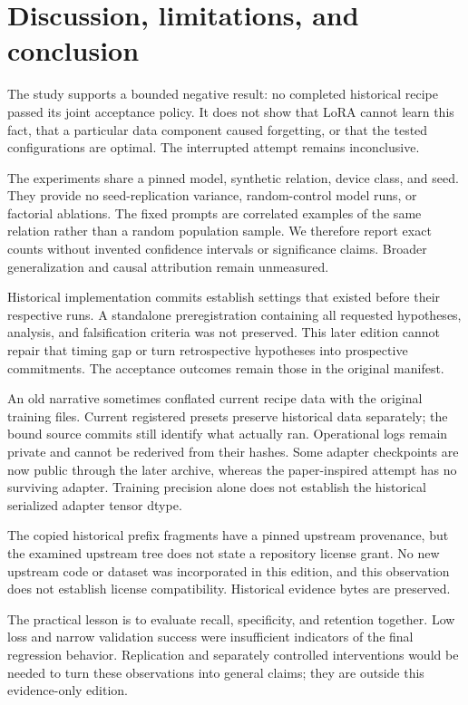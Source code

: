 \section{Discussion, limitations, and conclusion}
The study supports a bounded negative result: no completed historical recipe
passed its joint acceptance policy. It does not show that LoRA cannot learn
this fact, that a particular data component caused forgetting, or that the
tested configurations are optimal. The interrupted attempt remains
inconclusive.\citep{historicalmanifest,retrospective}

The experiments share a pinned model, synthetic relation, device class, and
seed. They provide no seed-replication variance, random-control model runs, or
factorial ablations. The fixed prompts are correlated examples of the same
relation rather than a random population sample. We therefore report exact
counts without invented confidence intervals or significance claims.
Broader generalization and causal attribution remain unmeasured.
\citep{retrospective}

Historical implementation commits establish settings that existed before their
respective runs. A standalone preregistration containing all requested
hypotheses, analysis, and falsification criteria was not preserved. This later
edition cannot repair that timing gap or turn retrospective hypotheses into
prospective commitments. The acceptance outcomes remain those in the original
manifest.\citep{historicalmanifest,retrospective}

An old narrative sometimes conflated current recipe data with the original
training files. Current registered presets preserve historical data separately;
the bound source commits still identify what actually ran. Operational logs
remain private and cannot be rederived from their hashes. Some adapter
checkpoints are now public through the later archive, whereas the
paper-inspired attempt has no surviving adapter. Training precision alone
does not establish the historical serialized adapter tensor dtype.
\citep{historicalmanifest,retrospective,archive,currentregistry}

The copied historical prefix fragments have a pinned upstream provenance, but
the examined upstream tree does not state a repository license grant. No new
upstream code or dataset was incorporated in this edition, and this observation
does not establish license compatibility. Historical evidence bytes are
preserved.\citep{gangadhar2024data,upstreamtree}

The practical lesson is to evaluate recall, specificity, and retention
together. Low loss and narrow validation success were insufficient indicators
of the final regression behavior. Replication and separately controlled
interventions would be needed to turn these observations into general claims;
they are outside this evidence-only edition.\citep{retrospective}
